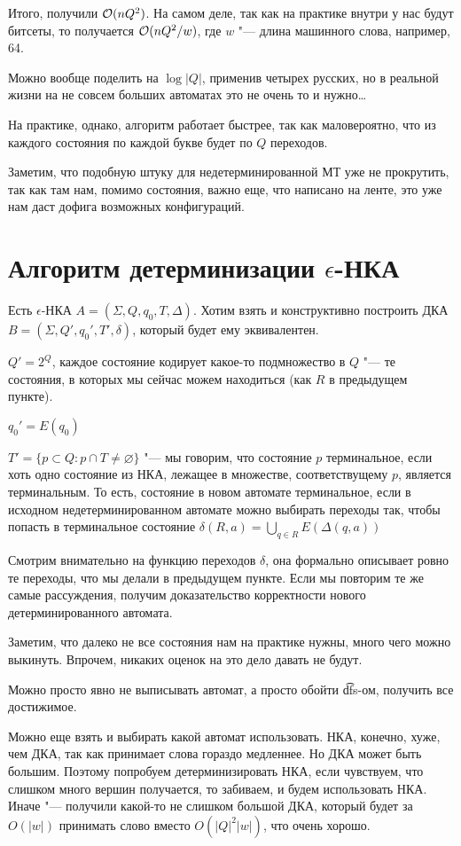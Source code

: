 Итого, получили $\mathcal{O}(nQ^2)$. На самом деле, так как на практике внутри у нас будут битсеты, то получается $\mathcal{O}(nQ^2/w)$, где $w$ "--- длина машинного слова, например, 64.

Можно вообще поделить на $\log |Q|$, применив четырех русских, но в реальной жизни на не совсем больших автоматах это не очень то и нужно\dots

\begin{Rem}
На практике, однако, алгоритм работает быстрее, так как маловероятно, что из каждого состояния по каждой букве будет по $Q$ переходов.
\end{Rem}

\begin{Rem}
Заметим, что подобную штуку для недетерминированной МТ уже не прокрутить, так как там нам, помимо состояния, важно еще, что написано на ленте, это уже нам даст дофига возможных конфигураций.
\end{Rem}


\section{Алгоритм детерминизации \texorpdfstring{$\epsilon$}{epsilon}-НКА}
Есть $\epsilon$-НКА $A = (\Sigma, Q, q_0, T, \Delta)$. 
Хотим взять и конструктивно построить ДКА $B = (\Sigma, Q', q_0', T', \delta)$, который будет ему эквивалентен.

$Q' = 2^Q$, каждое состояние кодирует какое-то подмножество в $Q$ "--- те состояния, в которых мы сейчас можем находиться (как $R$ в предыдущем пункте).

$q_0' = E(q_0)$

$T' = \{p \subset Q: p \cap T \neq \varnothing\}$ "--- мы говорим, что состояние $p$ терминальное, если хоть одно состояние из НКА, лежащее в множестве, соответствущему $p$, является терминальным.
То есть, состояние в новом автомате терминальное, если в исходном недетерминированном автомате можно выбирать переходы так, чтобы попасть в терминальное состояние
$\delta(R, a) = \bigcup\limits_{q \in R} E(\Delta(q, a))$

Смотрим внимательно на функцию переходов $\delta$, она формально описывает ровно те переходы, что мы делали в предыдущем пункте.
Если мы повторим те же самые рассуждения, получим доказательство корректности нового детерминированного автомата.

\begin{Rem}
Заметим, что далеко не все состояния нам на практике нужны, много чего можно выкинуть. Впрочем, никаких оценок на это дело давать не будут.

Можно просто явно не выписывать автомат, а просто обойти \t{dfs}-ом, получить все достижимое.

Можно еще взять и выбирать какой автомат использовать. 
НКА, конечно, хуже, чем ДКА, так как принимает слова гораздо медленнее. Но ДКА может быть большим. 
Поэтому попробуем детерминизировать НКА, если чувствуем, что слишком много вершин получается, то забиваем, и будем использовать НКА. 
Иначе "--- получили какой-то не слишком большой ДКА, который будет за $O(|w|)$ принимать слово вместо $O(|Q|^2|w|)$, что очень хорошо.
\end{Rem}


